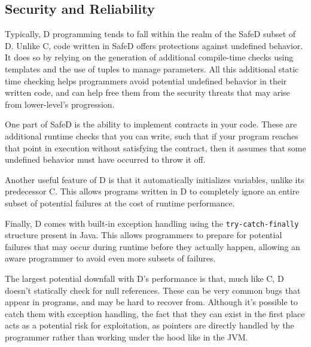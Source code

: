 \subsection{Security and Reliability}
Typically, D programming tends to fall within the realm of the SafeD
subset of D. Unlike C, code written in SafeD offers protections against
undefined behavior. It does so by relying on the generation of additional 
compile-time checks using templates and the use of tuples to manage parameters.
All this additional static time checking helps programmers avoid potential
undefined behavior in their written code, and can help free them from the
security threats that may arise from lower-level's progression.
\par
One part of SafeD is the ability to implement contracts in your code.
These are additional runtime checks that you can write, such that if your
program reaches that point in execution without satisfying the contract, then
it assumes that some undefined behavior must have occurred to throw it off. 
\par
Another useful feature of D is that it automatically initializes variables,
unlike its predecessor C. This allows programs written in D to completely
ignore an entire subset of potential failures at the cost of runtime
performance.
\par
Finally, D comes with built-in exception handling using the
\texttt{try-catch-finally} structure present in Java. This allows programmers to
prepare for potential failures that may occur during runtime before they
actually happen, allowing an aware programmer to avoid even more subsets of
failures.
\par
The largest potential downfall with D's performance is that, much like C, D
doesn't statically check for null references. These can be very common bugs that
appear in programs, and may be hard to recover from. Although it's possible to
catch them with exception handling, the fact that they can exist in the first
place acts as a potential risk for exploitation, as pointers are directly
handled by the programmer rather than working under the hood like in the JVM.

